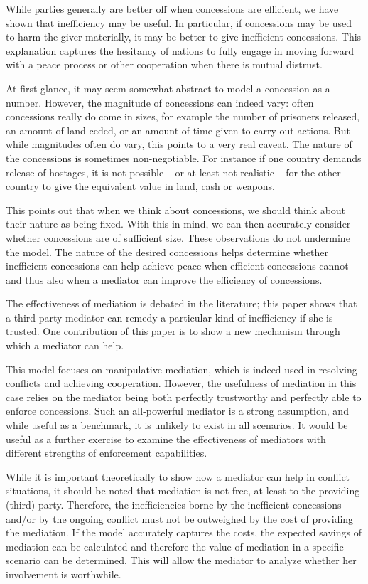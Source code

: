 \documentclass[12pt, letterpaper]{article}
\begin{document}
While parties generally are better off when concessions are efficient, we have shown that inefficiency may be useful. In particular, if concessions may be used to harm the giver materially, it may be better to give inefficient concessions. This explanation captures the hesitancy of nations to fully engage in moving forward with a peace process or other cooperation when there is mutual distrust. 

At first glance, it may seem somewhat abstract to model a concession as a number. However, the magnitude of concessions can indeed vary: often concessions really do come in sizes, for example the number of prisoners released, an amount of land ceded, or an amount of time given to carry out actions. But while magnitudes often do vary, this points to a very real caveat. The nature of the concessions is sometimes non-negotiable. For instance if one country demands release of hostages, it is not possible -- or at least not realistic -- for the other country to give the equivalent value in land, cash or weapons.

This points out that when we think about concessions, we should think about their nature as being fixed. With this in mind, we can then accurately consider whether concessions are of sufficient size. These observations do not undermine the model. The nature of the desired concessions helps determine whether inefficient concessions can help achieve peace when efficient concessions cannot and thus also when a mediator can improve the efficiency of concessions.

The effectiveness of mediation is debated in the literature; this paper shows that a third party mediator can remedy a particular kind of inefficiency if she is trusted. One contribution of this paper is to show a new mechanism through which a mediator can help.

This model focuses on manipulative mediation, which is indeed used in resolving conflicts and achieving cooperation. However, the usefulness of mediation in this case relies on the mediator being both perfectly trustworthy and perfectly able to enforce concessions. Such an all-powerful mediator is a strong assumption, and while useful as a benchmark, it is unlikely to exist in all scenarios. It would be useful as a further exercise to examine the effectiveness of mediators with different strengths of enforcement capabilities. 

While it is important theoretically to show how a mediator can help in conflict situations, it should be noted that mediation is not free, at least to the providing (third) party. Therefore, the inefficiencies borne by the inefficient concessions and/or by the ongoing conflict must not be outweighed by the cost of providing the mediation. If the model accurately captures the costs, the expected savings of mediation can be calculated and therefore the value of mediation in a specific scenario can be determined. This will allow the mediator to analyze whether her involvement is worthwhile. 
\end{document}
